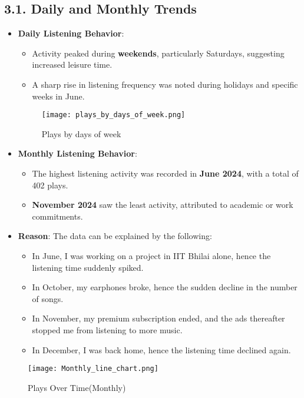\documentclass[12pt]{article}
\begin{document}
\begin{itemize}
\subsection*{3.1. Daily and Monthly Trends}
\begin{itemize}
    \item \textbf{Daily Listening Behavior}:
    \begin{itemize}
        \item Activity peaked during \textbf{weekends}, particularly Saturdays, suggesting increased leisure time.
        \item A sharp rise in listening frequency was noted during holidays and specific weeks in June.
    \end{itemize}
    \begin{figure}[H]
        \centering
        \texttt{[image: plays\_by\_days\_of\_week.png]}
        \caption{Plays by days of week}
        \label{fig:enter-label}
    \end{figure}
    \item \textbf{Monthly Listening Behavior}:
    \begin{itemize}
        \item The highest listening activity was recorded in \textbf{June 2024}, with a total of 402 plays.
        \item \textbf{November 2024} saw the least activity, attributed to academic or work commitments.
    \end{itemize}
    \item \textbf{Reason}: The data can be explained by the following:
    \begin{itemize}
        \item In June, I was working on a project in IIT Bhilai alone, hence the listening time suddenly spiked.
        \item In October, my earphones broke, hence the sudden decline in the number of songs.
        \item In November, my premium subscription ended, and the ads thereafter stopped me from listening to more music.
        \item In December, I was back home, hence the listening time declined again.
    \end{itemize}
\end{itemize}
\begin{figure}[H]
    \centering
    \texttt{[image: Monthly\_line\_chart.png]}
    \caption{Plays Over Time(Monthly)}
    \label{fig:enter-label}
\end{figure}


\end{itemize}
\end{document}
